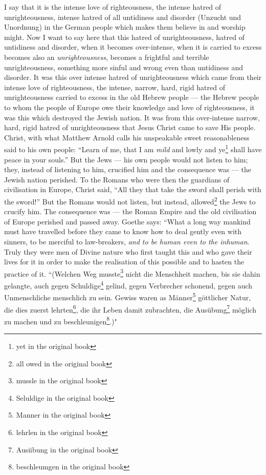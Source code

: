 I say that it is the intense love of righteousness, the intense hatred of unrighteousness, intense hatred of all untidiness and disorder (Unzucht und Unordnung) in the German people which makes them believe in and worship might.
Now I want to say here that this hatred of unrighteousness, hatred of untidiness and disorder, when it becomes over-intense, when it is carried to excess becomes also an \emph{unrighteousness}, becomes a frightful and terrible unrighteousness, something more sinful and wrong even than untidiness and disorder.
It was this over intense hatred of unrighteousness which came from their intense love of righteousness, the intense, narrow, hard, rigid hatred of unrighteousness carried to excess in the old Hebrew people --- the Hebrew people to whom the people of Europe owe their knowledge and love of righteousness, it was this which destroyed the Jewish nation.
It was from this over-intense narrow, hard, rigid hatred of unrighteousness that Jesus Christ came to save His people.
Christ, with what Matthew Arnold calls his unspeakable sweet reasonableness said to his own people: ``Learn of me, that I am \emph{mild} and lowly and ye\footnote{yet in the original book} shall have peace in your souls.''
But the Jews --- his own people would not listen to him; they, instead of listening to him, crucified him and the consequence was --- the Jewish nation perished.
To the Romans who were then the guardians of civilisation in Europe, Christ said, ``All they that take the sword shall perish with the sword!''\cite{num8} 
But the Romans would not listen, but instead, allowed\footnote{all owed in the original book} the Jews to crucify him.
The consequence was --- the Roman Empire and the old civilisation of Europe perished and passed away.
Goethe says: ``What a long way mankind must have travelled before they came to know how to deal gently even with sinners, to be merciful to law-breakers, \emph{and to be human even to the inhuman}.
Truly they were men of Divine nature who first taught this and who gave their lives for it in order to make the realisation of this possible and to hasten the practice of it.
``(Welchen Weg musste\footnote{mussle in the original book} nicht die Menschheit machen, bis sie dahin gelangte, auch gegen Schuldige\footnote{Seluldige in the original book} gelind, gegen Verbrecher schonend, gegen auch Unmenschliche menschlich zu sein. Gewiss waren as M\"anner\footnote{Manner in the original book} g\"ottlicher Natur, die dies zuerst lehrten\footnote{lehrlen in the original book}, die ihr Leben damit zubrachten, die Aus\"ubung\footnote{Ausiibung in the original book} m\"oglich zu machen und zu beschleunigen\footnote{beschleumgen in the original book}.)"

